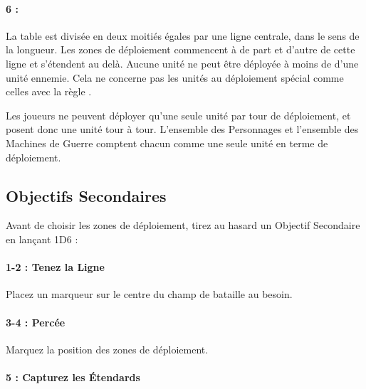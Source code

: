 \paragraph{6 : \counterthrust{}}

\begin{minipage}[c]{0.35\textwidth}
\def\svgwidth{\textwidth}

\end{minipage}\hfill
\begin{minipage}[c]{0.62\textwidth}
La table est divisée en deux moitiés égales par une ligne centrale, dans le sens de la longueur. Les zones de déploiement commencent à  de part et d'autre de cette ligne et s'étendent au delà. Aucune unité ne peut être déployée à moins de  d'une unité ennemie. Cela ne concerne pas les unités au déploiement spécial comme celles avec la règle \scout{}.

Les joueurs ne peuvent déployer qu'une seule unité par tour de déploiement, et posent donc une unité tour à tour. L'ensemble des Personnages et l'ensemble des Machines de Guerre comptent chacun comme une seule unité en terme de déploiement.
\end{minipage}


\newpage
\hypertarget{secondaryobjectives}{\subsection{Objectifs Secondaires}}

Avant de choisir les zones de déploiement, tirez au hasard un Objectif Secondaire en lançant 1D6 :

\paragraph{1-2 : Tenez la Ligne}

\newline
Placez un marqueur sur le centre du champ de bataille au besoin.

\paragraph{3-4 : Percée}

\newline
Marquez la position des zones de déploiement.

\paragraph{5 : Capturez les Étendards}

